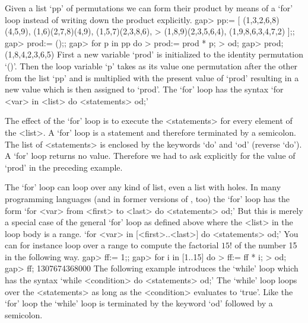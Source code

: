 \null

%
Given a list `pp' of permutations we can form their product by means of a
`for' loop instead of writing down the product explicitly.
\beginexample
    gap> pp:= [ (1,3,2,6,8)(4,5,9), (1,6)(2,7,8)(4,9), (1,5,7)(2,3,8,6),
    >           (1,8,9)(2,3,5,6,4), (1,9,8,6,3,4,7,2) ];;
    gap> prod:= ();;
    gap> for p in pp do
    >       prod:= prod * p;
    >    od;
    gap> prod;
    (1,8,4,2,3,6,5)
\endexample
First a  new variable `prod'  is initialized  to the identity permutation
`()'. Then the loop variable `p' takes as its value one permutation after
the other from the list `pp' and is multiplied with  the present value of
`prod'  resulting in a  new value which  is then assigned  to `prod'. The
`for' loop has the syntax `for <var> in <list> do <statements> od;'

The  effect of the `for'  loop  is to execute the <statements> for  every
element  of  the <list>.   A `for'  loop  is  a  statement  and therefore
terminated by a semicolon.  The list of <statements>  is enclosed by  the
keywords `do' and `od'  (reverse  `do').  A `for'  loop returns no value.
Therefore we had  to  ask  explicitly for  the  value  of  `prod' in  the
preceding example.

The `for' loop can loop over any kind of list, even a list with holes. In
many programming languages (and  in former versions  of {\GAP},  too) the
`for' loop has the form `for <var> from <first> to <last> do <statements>
od;' But   this is merely  a special  case of  the general `for'  loop as
defined above where the <list> in the loop body is a range. `for <var> in
[<first>..<last>] do <statements>  od;' You can for  instance loop over a
range to compute the  factorial $15!$ of the  number 15 in the  following
way.
\beginexample
    gap> ff:= 1;;
    gap> for i in [1..15] do
    >       ff:= ff * i;
    >    od;
    gap> ff;
    1307674368000 
\endexample
The following  example introduces the  `while' loop which  has the syntax
`while <condition> do <statements>  od;' The `while'  loop loops over the
<statements>  as long as  the <condition> evaluates  to  `true'. Like the
`for' loop the `while' loop is terminated by the keyword `od' followed by
a semicolon.


